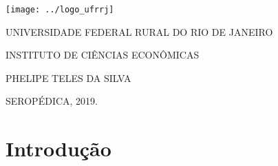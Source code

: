 \documentclass[a4paper,
               article,
               12pt,
               openany,
               oneside,
               english,
               brazil]{abntex2}
\numberwithin{equation}{section}
\begin{document}
\renewcommand{\imprimircapa}{%
    \begin{capa}%
        \center
        \texttt{[image: ../logo\_ufrrj]}
        
        \ABNTEXchapterfont
        \large UNIVERSIDADE FEDERAL RURAL DO RIO DE JANEIRO

        \large INSTITUTO DE CIÊNCIAS ECONÔMICAS

        \large PHELIPE TELES DA SILVA
        \vfill
        \begin{center}
            \ABNTEXchapterfont
            \bfseries
            \large \imprimirtitulo
        \end{center}
        \vfill
        \large SEROPÉDICA, 2019.
        \vspace*{1cm}
    \end{capa}}
\imprimircapa


\imprimirfolhaderosto

\tableofcontents*
\clearpage


\textual

\pagestyle{fancy}
\renewcommand{\headrulewidth}{0pt}

\section{Introdução}
\end{document}
